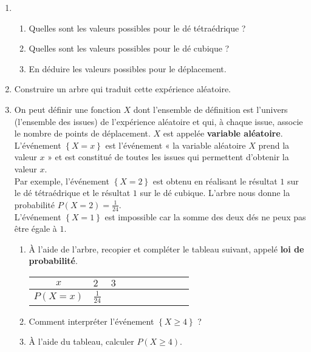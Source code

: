 \documentclass[11pt]{article}
\begin{document}
\begin{enumerate}
  \item \begin{enumerate}
      \item Quelles sont les valeurs possibles pour le dé tétraédrique ?
      \item Quelles sont les valeurs possibles pour le dé cubique ?
      \item En déduire les valeurs possibles pour le déplacement.
    \end{enumerate}
  \item Construire un arbre qui traduit cette expérience aléatoire.
  \item On peut définir une fonction $X$ dont l'ensemble de définition est
    l'univers (l'ensemble des issues) de l'expérience aléatoire et qui, à chaque
    issue, associe le nombre de points de déplacement. $X$ est appelée
    \textbf{variable aléatoire}.\\
    L'événement $\left\{ X=x \right\}$ est l'événement « la variable aléatoire
    $X$ prend la valeur $x$ » et est constitué de toutes les issues qui
    permettent d'obtenir la valeur $x$.\\
    Par exemple, l'événement $\left\{ X=2 \right\}$ est obtenu en réalisant le
    résultat $1$ sur le dé tétraédrique et le résultat $1$ sur le dé cubique.
    L'arbre nous donne la probabilité $P\left( X=2 \right)=\frac{1}{24}$.\\
    L'événement $\left\{ X=1 \right\}$ est impossible car la somme des deux dés
    ne peux pas être égale à $1$.
    \begin{enumerate}
      \item À l'aide de l'arbre, recopier et compléter le tableau suivant,
        appelé \textbf{loi de probabilité}.
        \begin{center}
          \renewcommand{\arraystretch}{1.3}
          \begin{tabularx}{.8\textwidth}{|c|Y|Y|Y|Y|Y|Y|Y|Y|Y|}
            \hline
            $x$ & $2$ & $3$ & & & & & & & \\
            \hline
            $P\left( X=x \right)$ & $\frac{1}{24}$ & & & & & & & & \\
            \hline
          \end{tabularx}
        \end{center}
      \item Comment interpréter l'événement $\left\{ X\geq4 \right\}$ ?
      \item À l'aide du tableau, calculer $P\left( X\geq4 \right)$.

\end{enumerate}
\end{enumerate}
\end{document}
